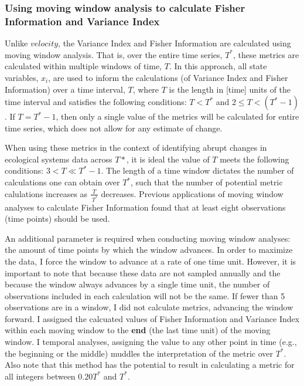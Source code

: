 \documentclass[12pt,twoside,openany]{reedthesis}
\begin{document}
\subsubsection{Using moving window analysis to calculate Fisher
Information and Variance
Index}\label{using-moving-window-analysis-to-calculate-fisher-information-and-variance-index}

Unlike \(velocity\), the Variance Index and Fisher Information are
calculated using moving window analysis. That is, over the entire time
series, \(T^*\), these metrics are calculated within multiple windows of
time, \(T\). In this approach, all state variables, \(x_i\), are used to
inform the calculations (of Variance Index and Fisher Information) over
a time interval, \(T\), where \(T\) is the length in {[}time{]} units of
the time interval and satisfies the following conditions: \(T < T^*\)
and \(2\leq T < (T^*-1)\). If \(T = T^*-1\), then only a single value of
the metrics will be calculated for entire time series, which does not
allow for any estimate of change.

When using these metrics in the context of identifying abrupt changes in
ecological systems data across \(T*\), it is ideal the value of \(T\)
meets the following conditions: \(3 < T \ll T^*-1\). The length of a
time window dictates the number of calculations one can obtain over
\(T^*\), such that the number of potential metric calulations increases
as \(\frac{T}{\ T^*}\) decreases. Previous applications of moving window
analyses to calculate Fisher Information found that at least eight
observations (time points) should be used.

An additional parameter is required when conducting moving window
analyses: the amount of time points by which the window advances. In
order to maximize the data, I force the window to advance at a rate of
one time unit. However, it is important to note that because these data
are not sampled annually and the because the window always advances by a
single time unit, the number of observations included in each
calculation will not be the same. If fewer than 5 observations are in a
window, I did not calculate metrics, advancing the window forward. I
assigned the calcuated values of Fisher Information and Variance Index
within each moving window to the \textbf{end} (the last time unit) of
the moving window. I temporal analyses, assigning the value to any other
point in time (e.g., the beginning or the middle) muddles the
interpretation of the metric over \(T^*\). Also note that this method
has the potential to result in calculating a metric for all integers
between \(0.20 T^*\) and \(T^*\).
\end{document}
